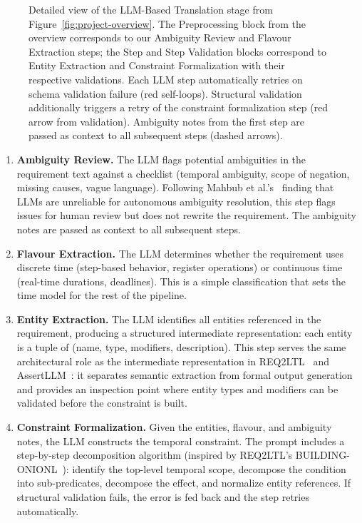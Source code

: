 \begin{figure}[ht]
{%
}
\caption{Detailed view of the LLM-Based Translation stage from
Figure~\ref{fig:project-overview}. The Preprocessing block from the
overview corresponds to our Ambiguity Review and Flavour Extraction
steps; the Step and Step Validation blocks correspond to Entity
Extraction and Constraint Formalization with their respective
validations. Each LLM step automatically retries on schema validation
failure (red self-loops). Structural validation additionally triggers a
retry of the constraint formalization step (red arrow from validation).
Ambiguity notes from the first step are passed as context to all
subsequent steps (dashed arrows).}
\label{fig:our-pipeline}
\end{figure}

\begin{enumerate}
\item \textbf{Ambiguity Review.} The LLM flags potential ambiguities in
the requirement text against a checklist (temporal ambiguity, scope of
negation, missing causes, vague language). Following Mahbub
et al.'s~\cite{mahbub2024gpt4ambiguity} finding that LLMs are unreliable
for autonomous ambiguity resolution, this step flags issues for human
review but does not rewrite the requirement. The ambiguity notes are
passed as context to all subsequent steps.

\item \textbf{Flavour Extraction.} The LLM determines whether the
requirement uses discrete time (step-based behavior, register operations)
or continuous time (real-time durations, deadlines). This is a simple
classification that sets the time model for the rest of the pipeline.

\item \textbf{Entity Extraction.} The LLM identifies all entities
referenced in the requirement, producing a structured intermediate
representation: each entity is a tuple of (name, type, modifiers,
description). This step serves the same architectural role as the
intermediate representation in
REQ2LTL~\cite{ma2025req2ltl} and
AssertLLM~\cite{yan2025assertllm}: it separates semantic extraction
from formal output generation and provides an inspection point where
entity types and modifiers can be validated before the constraint is
built.

\item \textbf{Constraint Formalization.} Given the entities, flavour,
and ambiguity notes, the LLM constructs the temporal constraint. The
prompt includes a step-by-step decomposition algorithm (inspired by
REQ2LTL's BUILDING-ONIONL~\cite{ma2025req2ltl}): identify the top-level
temporal scope, decompose the condition into sub-predicates, decompose
the effect, and normalize entity references. If structural validation
fails, the error is fed back and the step retries automatically.
\end{enumerate}

